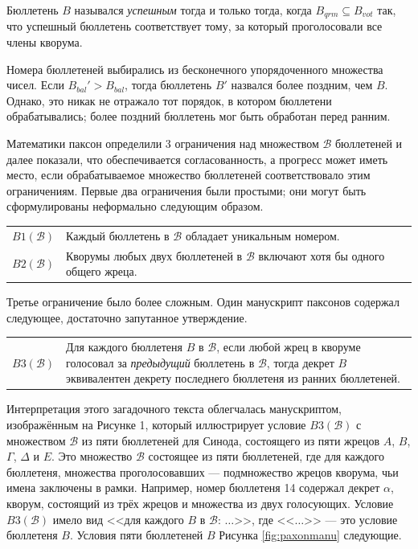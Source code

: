 \documentclass[12pt, a4paper]{article} %
\begin{document}
Бюллетень $B$ назывался \textit{успешным} тогда и только тогда, когда $B_{qrm} \subseteq B_{vot}$ так, что успешный бюллетень соответствует тому, за который проголосовали все члены кворума.

Номера бюллетеней выбирались из бесконечного упорядоченного множества чисел. Если $B_{bal}' > B_{bal}$, тогда бюллетень $B'$ назвался более поздним, чем $B$. Однако, это никак не отражало тот порядок, в котором бюллетени обрабатывались; более поздний бюллетень мог быть обработан перед ранним.

Математики паксон определили 3 ограничения над множеством $\mathcal{B}$ бюллетеней и далее показали, что обеспечивается согласованность, а прогресс может иметь место, если обрабатываемое множество бюллетеней соответствовало этим ограничениям. Первые два ограничения были простыми; они могут быть сформулированы неформально следующим образом.
\begin{table}[h]
\begin{tabular}{l p{10.5cm}}
    $B1(\mathcal{B})$ & Каждый бюллетень в $\mathcal{B}$ обладает уникальным номером.\\
    $B2(\mathcal{B})$ & Кворумы любых двух бюллетеней в $\mathcal{B}$ включают хотя бы одного общего жреца.
\end{tabular}
\end{table}

Третье ограничение было более сложным. Один манускрипт паксонов содержал следующее, достаточно запутанное утверждение.
\begin{table}[h]
\begin{tabular}{l p{10.5cm}}
    $B3(\mathcal{B})$ & Для каждого бюллетеня $B$ в $\mathcal{B}$, если любой жрец в кворуме голосовал за \textit{предыдущий} бюллетень в $\mathcal{B}$, тогда декрет $B$ эквивалентен декрету последнего бюллетеня из ранних бюллетеней. 
\end{tabular}
\end{table}

Интерпретация этого загадочного текста облегчалась манускриптом, изображённым на Рисунке 1, который иллюстрирует условие $B3(\mathcal{B})$ с множеством $\mathcal{B}$ из пяти бюллетеней для Синода, состоящего из пяти жрецов $A$, $B$, $\Gamma$, $\Delta$ и $E$. Это множество $\mathcal{B}$ состоящее из пяти бюллетеней, где для каждого бюллетеня, множества проголосовавших --- подмножество жрецов кворума, чьи имена заключены в рамки. Например, номер бюллетеня 14 содержал декрет $\alpha$, кворум, состоящий из трёх жрецов и множества из двух голосующих. Условие $B3(\mathcal{B})$ имело вид <<для каждого $B$ в $\mathcal{B}$: $\ldots$>>, где <<$\ldots$>> --- это условие бюллетеня $B$. Условия пяти бюллетеней $B$ Рисунка \ref{fig:paxonmanu} следующие.
\end{document}
